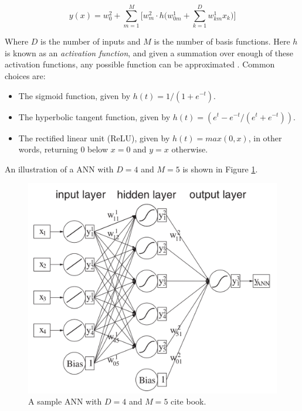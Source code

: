 \begin{equation}
    y(x) = w_0^2 + \sum_{m=1}^{M} \big [w_m^2 \cdot h \big (w_{0m}^1 + \sum_{k=1}^{D} w_{km}^1 x_k) ]
\end{equation}

Where $D$ is the number of inputs and $M$ is the number of basis functions. Here $h$ is known as an \textit{activation function}, and given a summation over enough of these activation functions, any possible function can be approximated \cite{nn-basis}. Common choices are:
\begin{itemize}
    \item The sigmoid function, given by $h(t) = 1/(1+e^{-t})$.
    \item The hyperbolic tangent function, given by $h(t) = (e^t - e^{-t}/(e^t + e^{-t}))$.
    \item The rectified linear unit (ReLU), given by $h(t)=max(0,x)$, in other words, returning 0 below $x=0$ and $y=x$ otherwise.
\end{itemize}

An illustration of a \gls{ANN} with $D=4$ and $M=5$ is shown in Figure \ref{fig:nn}. 

\begin{figure}[!ht] \label{fig:nn}
    \centering
    \includegraphics[width=.7\textwidth]{appendices/images/neural_network.png}
    \caption{A sample \gls{ANN} with $D=4$ and $M=5$ {\color{red} cite book}.}
\end{figure}
